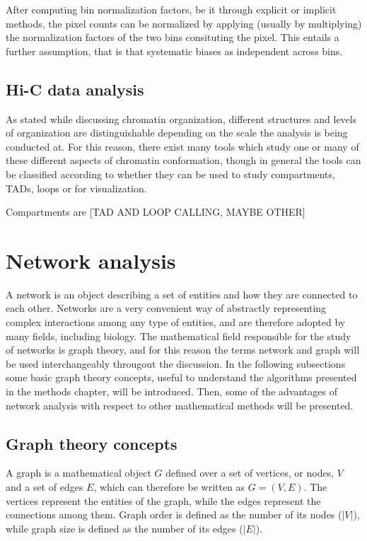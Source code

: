 After computing bin normalization factors, be it through explicit or implicit methods, the pixel counts can be normalized by applying (usually by multiplying) the normalization factors of the two bins consituting the pixel. This entails a further assumption, that is that systematic biases as independent across bins.

\subsection{Hi-C data analysis}

As stated while discussing chromatin organization, different structures and levels of organization are distinguishable depending on the scale the analysis is being conducted at. For this reason, there exist many tools which study one or many of these different aspects of chromatin conformation, though in general the tools can be classified according to whether they can be used to study compartments, TADs, loops or for visualization\cite{hicprocessing2018}.

Compartments are 
[TAD AND LOOP CALLING, MAYBE OTHER]


\section{Network analysis}

A network is an object describing a set of entities and how they are connected to each other. Networks are a very convenient way of abstractly representing complex interactions among any type of entities, and are therefore adopted by many fields, including biology. The mathematical field responsible for the study of networks is graph theory, and for this reason the terms network and graph will be used interchangeably througout the discussion. In the following subsections some basic graph theory concepts, useful to understand the algorithms presented in the methods chapter, will be introduced. Then, some of the advantages of network analysis with respect to other mathematical methods will be presented.


\subsection{Graph theory concepts}
A graph is a mathematical object $G$ defined over a set of vertices, or nodes, $V$ and a set of edges $E$, which can therefore be written as $G=(V,E)$. The vertices represent the entities of the graph, while the edges represent the connections among them. Graph order is defined as the number of its nodes ($|V|$), while graph size is defined as the number of its edges ($|E|$).

